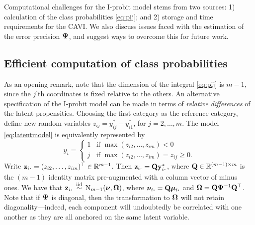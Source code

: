 Computational challenges for the I-probit model stems from two sources: 1) calculation of the class probabilities \cref{eq:pij}; and 2) storage and time requirements for the CAVI.
We also discuss issues faced with the estimation of the error precision ${\bm\Psi}$, and suggest ways to overcome this for future work.

\subsection{Efficient computation of class probabilities}
\label{misc:mnint}


As an opening remark, note that the dimension of the integral \cref{eq:pij} is $m-1$, since the $j$'th coordinates is fixed relative to the others.
An alternative specification of the I-probit model can be made in terms of \emph{relative differences} of the latent propensities.
Choosing the first category as the reference category, define new random variables $z_{ij} = y_{ij}^* - y_{i1}^*$, for $j = 2,\dots,m$. 
The model \cref{eq:latentmodel} is equivalently represented by
\begin{equation}
  y_i = 
  \begin{cases}
    1 & \text{if } \max (z_{i2},\dots,z_{im}) < 0 \\
    j & \text{if } \max (z_{i2},\dots,z_{im}) = z_{ij} \geq 0.
  \end{cases}
\end{equation} 
Write $\bz_{i\bigcdot} = (z_{i2},\dots,z_{im})^\top \in \bbR^{m-1}$.
Then $\bz_{i\bigcdot} = \bQ\by^*_{i\bigcdot}$, where ${\mathbf Q} \in \mathbb{R}^{(m-1)\times m}$  is the $(m-1)$ identity matrix pre-augmented with a column vector of minus ones.
We have that $\bz_{i\bigcdot} \iid \N_{m-1}(\bnu, \bOmega)$, where $\bnu_{i\bigcdot} = \bQ\bmu_{i\bigcdot}$ and ${\bm\Omega} = {\mathbf Q}{\bm\Psi}^{-1}{\mathbf Q}^\top$.
Note that if ${\bm\Psi}$ is diagonal, then the transformation to ${\bm\Omega}$ will not retain diagonality---indeed, each component will undoubtedly be correlated with one another as they are all anchored on the same latent variable.

